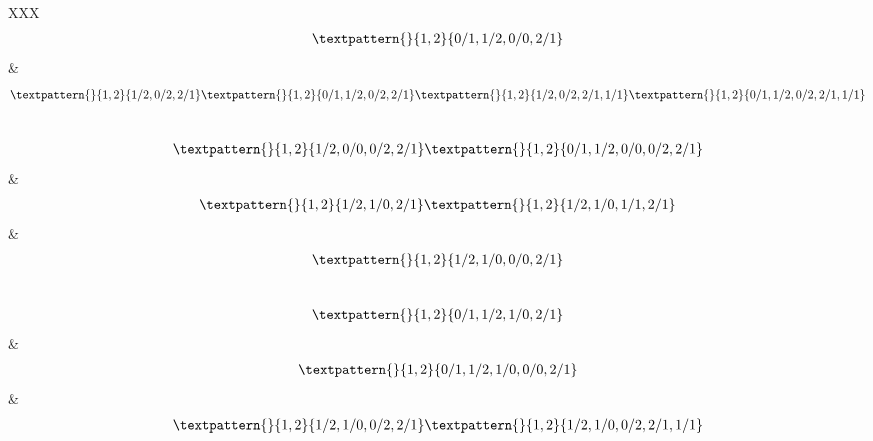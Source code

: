 \begin{center}
\begin{longtabu}[l]{XXX}
\begin{equation}
\begin{gathered}
		\textpattern{}{1,2}{0/1,1/2,0/0,2/1}
	\end{gathered}
	\label{cls:44}
\end{equation}
    &
\begin{equation}
	\begin{gathered}
		\textpattern{}{1,2}{1/2,0/2,2/1}
		\textpattern{}{1,2}{0/1,1/2,0/2,2/1}
		\textpattern{}{1,2}{1/2,0/2,2/1,1/1}
		\textpattern{}{1,2}{0/1,1/2,0/2,2/1,1/1}
	\end{gathered}
	\label{cls:45}
\end{equation}
\\
\begin{equation}
	\begin{gathered}
		\textpattern{}{1,2}{1/2,0/0,0/2,2/1}
		\textpattern{}{1,2}{0/1,1/2,0/0,0/2,2/1}
	\end{gathered}
	\label{cls:46}
\end{equation}
    &
\begin{equation}
	\begin{gathered}
		\textpattern{}{1,2}{1/2,1/0,2/1}
		\textpattern{}{1,2}{1/2,1/0,1/1,2/1}
	\end{gathered}
	\label{cls:47}
\end{equation}
    &
\begin{equation}
	\begin{gathered}
		\textpattern{}{1,2}{1/2,1/0,0/0,2/1}
	\end{gathered}
	\label{cls:48}
\end{equation}
\\
\begin{equation}
	\begin{gathered}
		\textpattern{}{1,2}{0/1,1/2,1/0,2/1}
	\end{gathered}
	\label{cls:49}
\end{equation}
    &
\begin{equation}
	\begin{gathered}
		\textpattern{}{1,2}{0/1,1/2,1/0,0/0,2/1}
	\end{gathered}
	\label{cls:50}
\end{equation}
    &
\begin{equation}
	\begin{gathered}
		\textpattern{}{1,2}{1/2,1/0,0/2,2/1}
		\textpattern{}{1,2}{1/2,1/0,0/2,2/1,1/1}
	\end{gathered}
	\label{cls:51}
\end{equation}
\\
\begin{equation}
	\begin{gathered}

\end{gathered}
\end{equation}
\end{longtabu}
\end{center}
